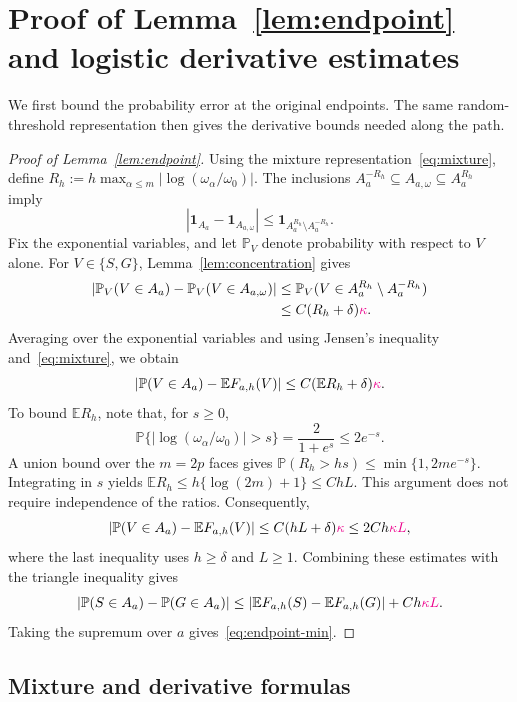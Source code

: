\documentclass[11pt,letterpaper]{article}
\newenvironment{recovered}{}{}
\newcommand{\vSix}[1]{{\color{magenta}#1}}
\theoremstyle{remark}
\newcommand{\E}{\mathbb E}
\newcommand{\Pp}{\mathbb P}
\newcommand{\ind}{\mathbf 1}
\begin{document}
\section{Proof of Lemma~\ref*{lem:endpoint} and logistic derivative estimates}\label{appx-sec:smoothing}
We first bound the probability error at the original endpoints.
The same random-threshold representation then gives the derivative
bounds needed along the path.
\begin{proof}[Proof of Lemma~\ref{lem:endpoint}]
\begin{recovered}
Using the mixture representation~\eqref{eq:mixture}, {define}
\(R_h:=h\max_{\alpha\le m}|\log(\omega_\alpha/\omega_0)|\).
The inclusions \(A_a^{-R_h}\subseteq A_{a,\omega}\subseteq A_a^{R_h}\)
imply
\[
 |\ind_{A_a}-\ind_{A_{a,\omega}}|
 \le\ind_{A_a^{R_h}\setminus A_a^{-R_h}}.
\]
Fix the exponential variables, and let \(\Pp_V\) denote probability
with respect to \(V\) alone. For \(V\in\{S,G\}\),
Lemma~\ref{lem:concentration} gives
\[
 \begin{aligned}
 |\Pp_V(V\in A_a)-\Pp_V(V\in A_{a,\omega})|
 &\le\Pp_V(V\in A_a^{R_h}\setminus A_a^{-R_h})\\
 &\le C(R_h+\delta)\vSix{\kappa}.
 \end{aligned}
\]
Averaging over the exponential variables and using Jensen's inequality
and~\eqref{eq:mixture}, we obtain
\[
 |\Pp(V\in A_a)-\E F_{a,h}(V)|
 \le C(\E R_h+\delta)\vSix{\kappa}.
\]
To bound \(\E R_h\), note that, for \(s\ge0\),
\[
 \Pp\{|\log(\omega_\alpha/\omega_0)|>s\}
 =\frac2{1+e^s}\le2e^{-s}.
\]
A union bound over the \(m=2p\) faces gives
\(\Pp(R_h>hs)\le\min\{1,2me^{-s}\}\). Integrating in \(s\)
yields \(\E R_h\le h\{\log(2m)+1\}\le ChL\). This argument
does not require independence of the ratios. Consequently,
\[
 |\Pp(V\in A_a)-\E F_{a,h}(V)|
 \le C(hL+\delta)\vSix{\kappa}\le2Ch\vSix{\kappa L},
\]
where the last inequality uses \(h\ge\delta\) and \(L\ge1\).
Combining these estimates with the triangle inequality gives
\[
 |\Pp(S\in A_a)-\Pp(G\in A_a)|
 \le|\E F_{a,h}(S)-\E F_{a,h}(G)|+Ch\vSix{\kappa L}.
\]
Taking the supremum over \(a\) gives~\eqref{eq:endpoint-min}.
\end{recovered}
\end{proof}

\subsection{\texorpdfstring{Mixture and derivative formulas}{Mixture and derivative formulas}}\label{appx-sec:mixture}
\end{document}

